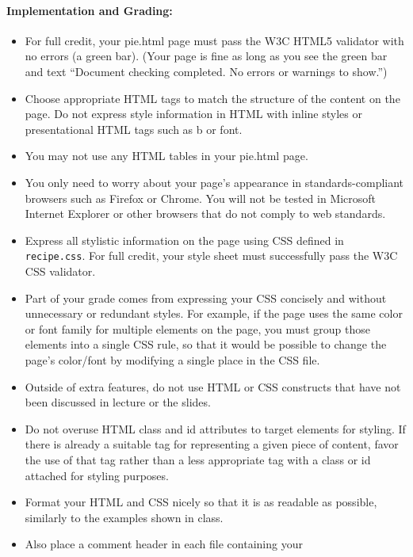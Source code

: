 \documentclass{article}
\begin{document}
\paragraph{Implementation and Grading:} \mbox{}
  \begin{itemize}
    \item For full credit, your pie.html page must pass the W3C HTML5
      validator with no errors (a green bar). (Your page is fine as
      long as you see the green bar and text ``Document checking
      completed. No errors or warnings to show.'')
    \item Choose appropriate HTML tags to match the structure of the
      content on the page. Do not express style information in HTML
      with inline styles or presentational HTML tags such as b or
      font.
    \item You may not use any HTML tables in your pie.html page.
    \item You only need to worry about your page's appearance in
      standards-compliant browsers such as Firefox or Chrome.  You
      will not be tested in Microsoft Internet Explorer or other
      browsers that do not comply to web standards.
    \item Express all stylistic information on the page using CSS
      defined in {\tt recipe.css}. For full credit, your style sheet
      must successfully pass the W3C CSS validator.
    \item Part of your grade comes from expressing your CSS concisely
      and without unnecessary or redundant styles. For example, if the
      page uses the same color or font family for multiple elements on
      the page, you must group those elements into a single CSS rule,
      so that it would be possible to change the page's color/font by
      modifying a single place in the CSS file.
    \item Outside of extra features, do not use HTML or CSS constructs
      that have not been discussed in lecture or the slides.
    \item Do not overuse HTML class and id attributes to target
      elements for styling. If there is already a suitable tag for
      representing a given piece of content, favor the use of that tag
      rather than a less appropriate tag with a class or id attached
      for styling purposes.
    \item Format your HTML and CSS nicely so that
      it is as readable as possible, similarly to the examples shown
      in class.
    \item Also place a comment header in each file containing your

\end{itemize}
\end{document}
